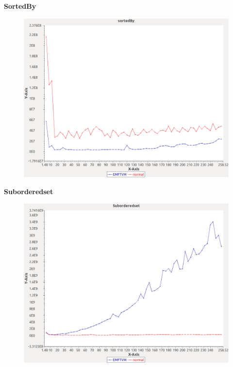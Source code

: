 \noindent\textbf{SortedBy}

\begin{figure}[h]
\centering
\includegraphics[width=\textwidth]{graphs/orderedset/sortedBy}
\end{figure}
\pagebreak

\noindent\textbf{Suborderedset}

\begin{figure}[h]
\centering
\includegraphics[width=\textwidth]{graphs/orderedset/Suborderedset}
\end{figure}
\pagebreak

